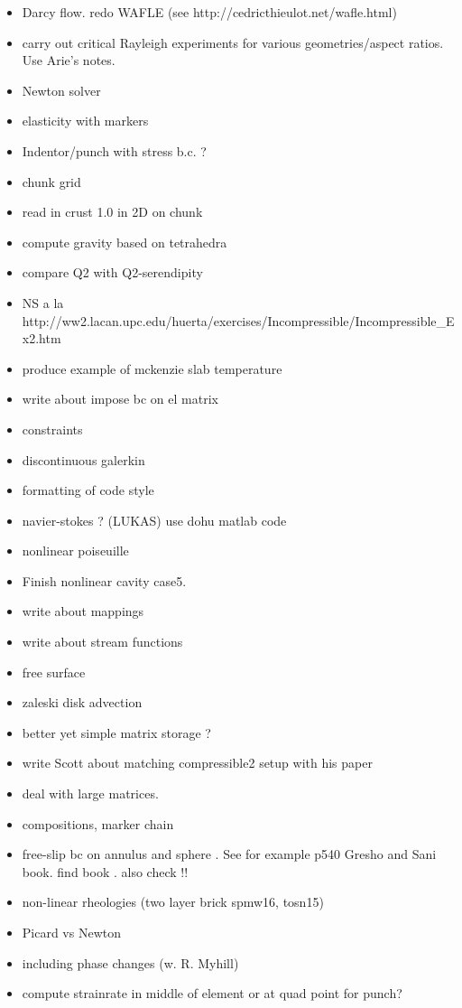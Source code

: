
\begin{itemize}
\item Darcy flow. redo WAFLE (see http://cedricthieulot.net/wafle.html)
\item carry out critical Rayleigh experiments for various geometries/aspect ratios. Use Arie's notes. 
\item Newton solver
\item elasticity with markers
\item Indentor/punch with stress b.c. ?
\item chunk grid
\item read in crust 1.0 in 2D on chunk
\item compute gravity based on tetrahedra
\item compare Q2 with Q2-serendipity
\item NS a la http://ww2.lacan.upc.edu/huerta/exercises/Incompressible/Incompressible\_Ex2.htm
\item produce example of mckenzie slab temperature
\item write about impose bc on el matrix
\item constraints
\item discontinuous galerkin
\item formatting of code style
\item navier-stokes ? (LUKAS) use dohu matlab code
\item nonlinear poiseuille
\item Finish nonlinear cavity case5.
\item write about mappings 
\item write about stream functions 
\item free surface 
\item zaleski disk advection
\item better yet simple matrix storage ?
\item write Scott about matching compressible2 setup with his paper
\item deal with large matrices. 
\item compositions, marker chain
\item free-slip bc on annulus and sphere . See for example p540 Gresho and Sani book. find book \cite{deab72}.
also check \cite{ensa82} !!
\item non-linear rheologies (two layer brick spmw16, tosn15) 
\item Picard vs Newton
\item including phase changes (w. R. Myhill)
\item compute strainrate in middle of element or at quad point for punch?

\end{itemize}
